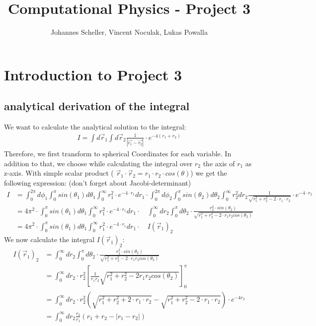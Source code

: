 \documentclass[10pt,a4paper]{article}
\author{Johannes Scheller, Vincent Noculak, Lukas Powalla}
\title{Computational Physics - Project 3}
\begin{document}
\maketitle
\newpage
\tableofcontents
\newpage
\section{Introduction to Project 3}

\subsection{analytical derivation of the integral }

We want to calculate the analytical solution to the integral:
\begin{align*}
I = \int d\vec{r}_1 \int d\vec{r}_2 \frac{1}{|\vec{r_1}-\vec{r_2}|} \cdot e^{-4(r_1+r_2)}
\end{align*}
Therefore, we first transform to spherical Coordinates for each variable. In addition to that, we choose while calculating the integral over $r_2$ the axis of $r_1$ as z-axis. With simple scalar product ( $\vec{r}_1 \cdot \vec{r}_2= r_1 \cdot r_2 \cdot cos( \theta)$) we get the following expression: (don't forget about Jacobi-determinant)
\begin{align}
I&=\int_{0}^{2 \pi} d\phi_1 \int_{0}^{ \pi} sin(\theta_1) d\theta_1 \int_{0}^{\infty}  r_1^2 \cdot e^{-4 \cdot r_1} dr_1\cdot \int_{0}^{2 \pi} d\phi_2 \int_{0}^{ \pi} sin(\theta_2) d\theta_2 \int_{0}^{\infty}  r_2^2 dr_2 \frac{1}{\sqrt{r_1^2+r_2^2-2 \cdot r_1 \cdot r_2}} \cdot e^{-4 \cdot r_2}\\
&= 4 \pi^2 \cdot \int_{0}^{ \pi} sin(\theta_1) d\theta_1 \int_{0}^{\infty}  r_1^2 \cdot e^{-4 \cdot r_1} dr_1 \cdot \quad \int_{0}^{\infty} dr_2 \int_{0}^{\pi} d\theta_2 \cdot \frac{r_2^2 \cdot sin(\theta_2)}{\sqrt{r_1^2+r_2^2-2 \cdot r_1 r_2 cos(\theta_2)}}\\
&= 4 \pi^2 \cdot \int_{0}^{ \pi} sin(\theta_1) d\theta_1 \int_{0}^{\infty}  r_1^2 \cdot e^{-4 \cdot r_1} dr_1 \cdot \quad I(\vec{r}_1)_2
\end{align}
We now calculate the integral $I(\vec{r}_1)_2$:
\begin{align}
I(\vec{r}_1)_2&= \int_{0}^{\infty} dr_2 \int_{0}^{\pi} d\theta_2 \cdot \frac{r_2^2 \cdot sin(\theta_2)}{\sqrt{r_1^2+r_2^2-2 \cdot r_1 r_2 cos(\theta_2)}}\\
&= \int_{0}^{\infty} dr_2 \cdot r_2^2 \left[ \frac{1}{r_1 r_2} \sqrt{r_1^2+r_2^2 - 2 r_1 r_2 cos(\theta_2)} \right]_0^{\pi}\\
&= \int_{0}^{\infty} dr_2 \cdot r_2^2 \left( \sqrt{r_1^2+r_2^2+2 \cdot r_1 \cdot r_2} -\sqrt{r_1^2+r_2^2-2 \cdot r_1 \cdot r_2}\right) \cdot e^{-4r_2}\\ 
&= \int_{0}^{\infty} dr_2 \frac{r_2}{r_1} \left( r_1+r_2 - |r_1-r_2| \right)
\end{align}
\end{document}
